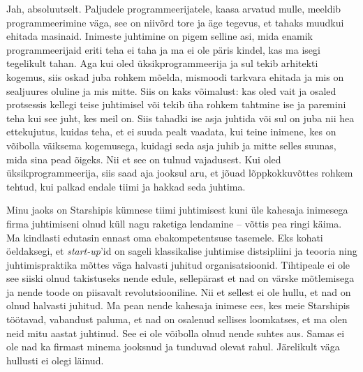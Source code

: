 
Jah, absoluutselt. Paljudele programmeerijatele, 
kaasa arvatud mulle, meeldib programmeerimine väga, see on niivõrd 
tore ja äge tegevus, et tahaks  
muudkui ehitada masinaid. Inimeste juhtimine on pigem selline asi, mida 
enamik programmeerijaid eriti teha ei taha ja ma ei ole päris kindel, kas ma 
isegi tegelikult tahan. Aga kui 
oled üksikprogrammeerija ja sul tekib arhitekti kogemus, siis 
oskad juba rohkem mõelda, mismoodi tarkvara ehitada ja mis 
on sealjuures oluline ja mis mitte. Siis on kaks võimalust: 
kas oled vait ja osaled protsessis kellegi teise juhtimisel või tekib üha 
rohkem tahtmine ise ja paremini 
teha kui see juht, kes meil on. Siis tahadki ise asja juhtida või sul on juba 
nii 
hea ettekujutus, kuidas teha, et ei suuda pealt vaadata, kui 
teine inimene, kes on võibolla väiksema kogemusega,  
kuidagi seda asja juhib ja mitte selles suunas, mida sina pead õigeks. Nii et 
see on tulnud vajadusest. Kui 
oled üksikprogrammeerija, siis saad aja jooksul aru, et jõuad
lõppkokkuvõttes rohkem tehtud, kui palkad 
endale tiimi ja hakkad seda juhtima. 

Minu jaoks on Starshipis kümnese 
tiimi juhtimisest kuni üle kahesaja inimesega firma juhtimiseni olnud küll nagu 
raketiga lendamine -- võttis pea ringi käima. Ma kindlasti 
edutasin ennast oma ebakompetentsuse tasemele. Eks kohati öeldaksegi, et 
\emph{start-up}'id on sageli klassikalise juhtimise 
distsipliini ja teooria ning juhtimispraktika mõttes väga halvasti juhitud 
organisatsioonid. Tihtipeale ei ole see siiski olnud takistuseks nende edule, 
sellepärast et nad on värske mõtlemisega ja nende toode on 
piisavalt revolutsiooniline. Nii et sellest ei ole 
hullu, et nad on olnud halvasti juhitud. Ma pean nende kahesaja 
inimese ees, kes meie Starshipis töötavad, vabandust paluma, et nad on osalenud 
sellises loomkatses, 
et ma olen neid mitu aastat juhtinud. See ei ole võibolla olnud nende 
suhtes aus. Samas ei ole nad ka firmast minema jooksnud 
ja tunduvad olevat rahul. Järelikult väga hullusti ei olegi läinud.
